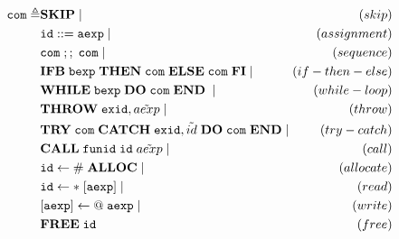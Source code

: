 \begin{equation}
\begin{alignedat}{2}
\verb|com| \triangleq & \textbf{SKIP} \;|\; & (skip) \\&
	\verb|id| ::= \verb|aexp| \;|\; & (assignment) \\&
	\verb|com|\; ;;\; \verb|com| \;|\; & (sequence) \\&
	\textbf{IFB}\; \verb|bexp|\; \textbf{THEN}\; \verb|com|\; \textbf{ELSE}\; \verb|com|\; \textbf{FI} \;|\; & (if-then-else) \\&
	\textbf{WHILE}\; \verb|bexp|\; \textbf{DO}\; \verb|com|\; \textbf{END}\; \;|\; & (while-loop) \\&
	\textbf{THROW}\; \verb|exid|, \tilde{aexp} \;|\; & (throw) \\&
	\textbf{TRY}\; \verb|com|\; \textbf{CATCH}\; \verb|exid|, \tilde{id}\; \textbf{DO}\; \verb|com|\; \textbf{END} \;|\; & (try-catch) \\&
	\textbf{CALL}\; \verb|funid|\; \verb|id|\; \tilde{aexp} \;|\; & (call) \\&
	\verb|id|\leftarrow\#\;\textbf{ALLOC} \;|\; & (allocate) \\&
	\verb|id|\leftarrow*\;[\verb|aexp|] \;|\; & (read) \\&
	[\verb|aexp|]\leftarrow@\;\verb|aexp| \;|\; & (write) \\&
	\textbf{FREE}\;\verb|id| & (free)
\end{alignedat}
\end{equation}

